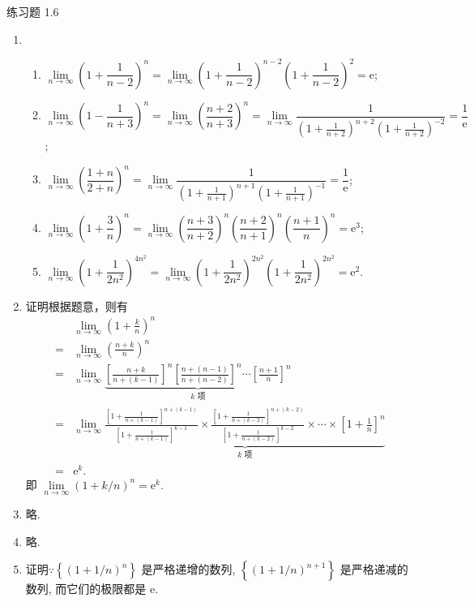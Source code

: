 \documentclass[12pt, a4paper]{article}
\begin{document}
\pagestyle{empty}

\begin{center}
    {\heiti 练习题 1.6}
\end{center}

\begin{enumerate}
    \item 
        \begin{enumerate}[(1)]
            \item $\lim\limits_{n\to\infty}\left(1 + \dfrac{1}{n-2}\right)^n = \lim\limits_{n\to\infty}\left(1 + \dfrac{1}{n-2}\right)^{n-2}\left(1 + \dfrac{1}{n-2}\right)^2 = \mathrm{e}$;
            \item $\lim\limits_{n\to\infty}\left(1 - \dfrac{1}{n+3}\right)^n = \lim\limits_{n\to\infty}\left(\dfrac{n+2}{n+3}\right)^n = \lim\limits_{n\to\infty}\dfrac{1}{\left(1 + \frac{1}{n+2}\right)^{n+2}\left(1 + \frac{1}{n+2}\right)^{-2}} = \dfrac{1}{\mathrm{e}}$;
            \item $\lim\limits_{n\to\infty}\left(\dfrac{1+n}{2+n}\right)^n = \lim\limits_{n\to\infty}\dfrac{1}{\left(1 + \frac{1}{n+1}\right)^{n+1} \left(1 + \frac{1}{n+1}\right)^{-1}} = \dfrac{1}{\mathrm{e}}$;
            \item $\lim\limits_{n\to\infty}\left(1 + \dfrac 3n\right)^n = \lim\limits_{n\to\infty}\left(\dfrac{n+3}{n+2}\right)^n\left(\dfrac{n+2}{n+1}\right)^n\left(\dfrac{n+1}{n}\right)^n = \mathrm{e}^3$;
            \item $\lim\limits_{n\to\infty}\left(1 + \dfrac{1}{2n^2}\right)^{4n^2} = \lim\limits_{n\to\infty}\left(1 + \dfrac{1}{2n^2}\right)^{2n^2} \left(1 + \dfrac{1}{2n^2}\right)^{2n^2} = \mathrm{e}^2$.
        \end{enumerate}
    \item {\heiti 证明}\quad 根据题意，则有
        \begin{align*}
                & \lim_{n\to\infty}\left(1 + \frac kn\right)^n \\
            ={} & \lim_{n\to\infty}\left(\frac{n+k}{n}\right)^n \\
            ={} & \lim_{n\to\infty}\underbrace{\left[\frac{n+k}{n+(k-1)}\right]^n\left[\frac{n+(n-1)}{n+(n-2)}\right]^n\cdots\left[\frac{n+1}{n}\right]^n}_{\text{$k$ 项}} \\
            ={} & \lim_{n\to\infty}\underbrace{\frac{\left[1 + \frac{1}{n+(k-1)}\right]^{n+(k-1)}}{\left[1 + \frac{1}{n+(k-1)}\right]^{k-1}} \times \frac{\left[1 + \frac{1}{n+(k-2)}\right]^{n+(k-2)}}{\left[1 + \frac{1}{n+(k-2)}\right]^{k-2}} \times \cdots \times \left[1 + \frac 1n\right]^n}_{\text{$k$ 项}} \\
            ={} & \mathrm{e}^k.
        \end{align*}
        即 $\lim\limits_{n\to\infty}\left(1 + k/n\right)^n = \mathrm{e}^k$.
    \item 略.
    \item 略.
    \item {\heiti 证明}\quad $\because \left\{\left(1 + 1/n\right)^n\right\}$ 是严格递增的数列, $\left\{\left(1 + 1/n\right)^{n+1}\right\}$ 是严格递减的数列,
        而它们的极限都是 $\mathrm{e}$.
        

\end{enumerate}
\end{document}
